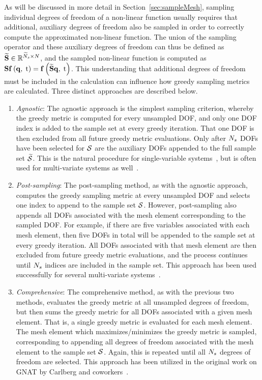 As will be discussed in more detail in Section~\ref{sec:sampleMesh}, sampling individual degrees of freedom of a non-linear function usually requires that additional, auxiliary degrees of freedom also be sampled in order to correctly compute the approximated non-linear function. The union of the sampling operator and these auxiliary degrees of freedom can thus be defined as $\mathbf{\widetilde{S}} \in \mathbb{R}^{\widetilde{N}_s \times N}$, and the sampled non-linear function is computed as $\mathbf{S} \mathbf{f} \left(\mathbf{q}, \; \text{t}\right) = \mathbf{f} \left(\mathbf{\widetilde{S}} \mathbf{q}, \; \text{t}\right)$. This understanding that additional degrees of freedom must be included in the calculation can influence how greedy sampling metrics are calculated. Three distinct approaches are described below.

\begin{enumerate}
	\item \textit{Agnostic}: The agnostic approach is the simplest sampling criterion, whereby the greedy metric is computed for every unsampled DOF, and only one DOF index is added to the sample set at every greedy iteration. That one DOF is then excluded from all future greedy metric evaluations. Only after $N_s$ DOFs have been selected for $\mathcal{S}$ are the auxiliary DOFs appended to the full sample set $\mathcal{\widetilde{S}}$. This is the natural procedure for single-variable systems~\cite{Chaturantabut2010}, but is often used for multi-variate systems as well~\cite{Chaturantabut2011}.
	\item \textit{Post-sampling}: The post-sampling method, as with the agnostic approach, computes the greedy sampling metric at every unsampled DOF and selects one index to append to the sample set $\mathcal{S}$. However, post-sampling also appends all DOFs associated with the mesh element corresponding to the sampled DOF. For example, if there are five variables associated with each mesh element, then five DOFs in total will be appended to the sample set at every greedy iteration. All DOFs associated with that mesh element are then excluded from future greedy metric evaluations, and the process continues until $N_s$ indices are included in the sample set. This approach has been used successfully for several multi-variate systems~\cite{Zhou2012,Wentland2021}.
	\item \textit{Comprehensive}: The comprehensive method, as with the previous two methods, evaluates the greedy metric at all unsampled degrees of freedom, but then sums the greedy metric for all DOFs associated with a given mesh element. That is, a single greedy metric is evaluated for each mesh element. The mesh element which maximizes/minimizes the greedy metric is sampled, corresponding to appending all degrees of freedom associated with the mesh element to the sample set $\mathcal{S}$. Again, this is repeated until all $N_s$ degrees of freedom are selected. This approach has been utilized in the original work on GNAT by Carlberg and coworkers~\cite{Carlberg2013,Carlberg2017}.
\end{enumerate}

